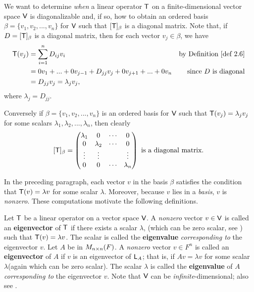 \begin{remark} \label{remark 5.1.2}
We want to determine \emph{when} a linear operator \(\textsf{T}\) on a finite-dimensional vector space \(\textsf{V}\) is diagonalizable and,
if so, how to obtain an ordered basis \(\beta = \{ v_1, v_2, ..., v_n \}\) for \(\textsf{V}\) such that \([\textsf{T}]_{\beta}\) is a diagonal matrix.
Note that, if \(D = [\textsf{T}]_{\beta}\) is a diagonal matrix, then for each vector \(v_j \in \beta\), we have
\begin{align*}
    \T(v_j) & = \sum_{i = 1}^n D_{ij} v_i & \text{by \DEF{2.6}} \\
            & = 0 v_1 + ... + 0 v_{j - 1} + D_{jj} v_j + 0 v_{j + 1} + ... + 0 v_n & \text{since \(D\) is diagonal} \\
            & = D_{jj} v_j = \lambda_j v_j,
\end{align*}
where \(\lambda_j = D_{jj}\).

Conversely if \(\beta = \{ v_1, v_2, ..., v_n \}\) is an ordered basis for \(\textsf{V}\) such that \(\textsf{T}(v_j) = \lambda_j v_j\) for some scalars \(\lambda_1, \lambda_2, ..., \lambda_n\), then clearly
\[
    [\textsf{T}]_{\beta} = \begin{pmatrix}
        \lambda_{1} & 0 & \cdots & 0 \\
        0 & \lambda_{2} & \cdots & 0 \\
        \vdots & \vdots & & \vdots \\
        0 & 0 & \cdots & \lambda_{n}
    \end{pmatrix} \text{ is a diagonal matrix.}
\]
\end{remark}

In the preceding paragraph, each vector \(v\) in the basis \(\beta\) satisfies the condition that \(\textsf{T}(v) = \lambda v\) for some scalar \(\lambda\).
Moreover, because \(v\) lies in a \emph{basis}, \(v\) is \emph{nonzero}.
These computations motivate the following definitions.

\begin{definition} \label{def 5.2}
Let \(\textsf{T}\) be a linear operator on a vector space \(\textsf{V}\).
A \emph{nonzero} vector \(v \in \textsf{V}\) is called an \textbf{eigenvector} of \(\textsf{T}\) if there exists a scalar \(\lambda\), (which can be zero scalar, see ) such that \(\textsf{T}(v) = \lambda v\).
The scalar is called the \textbf{eigenvalue} \emph{corresponding to} the eigenvector \(v\).
Let \(A\) be in \(M_{n \times n}(F)\).
A \emph{nonzero} vector \(v \in F^n\) is called an \textbf{eigenvector} of \(A\) if \(v\) is an eigenvector of \(\textsf{L}_A\);
that is, if \(Av = \lambda v\) for some scalar \(\lambda\)(again which can be zero scalar).
The scalar \(\lambda\) is called the \textbf{eigenvalue} of \(A\) \emph{corresponding to} the eigenvector \(v\).
Note that \(\textsf{V}\) can be \emph{infinite}-dimensional;
also see .
\end{definition}

